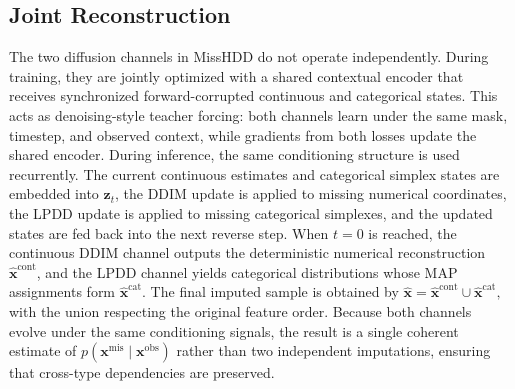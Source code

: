 \documentclass[times, review, 10pt]{elsarticle}
\begin{document}
\subsection{Joint Reconstruction}

The two diffusion channels in MissHDD do not operate independently. During
training, they are jointly optimized with a shared contextual encoder that
receives synchronized forward-corrupted continuous and categorical states. This
acts as denoising-style teacher forcing: both channels learn under the same
mask, timestep, and observed context, while gradients from both losses update
the shared encoder. During inference, the same conditioning structure is used
recurrently. The current continuous estimates and categorical simplex states
are embedded into $\mathbf{z}_t$, the DDIM update is applied to missing
numerical coordinates, the LPDD update is applied to missing categorical
simplexes, and the updated states are fed back into the next reverse step. When
$t=0$ is reached, the continuous DDIM channel outputs the deterministic
numerical reconstruction $\hat{\mathbf{x}}^{\mathrm{cont}}$, and the LPDD
channel yields categorical distributions whose MAP assignments form
$\hat{\mathbf{x}}^{\mathrm{cat}}$. The final imputed sample is obtained by $ \hat{\mathbf{x}} = \hat{\mathbf{x}}^{\mathrm{cont}}\cup \hat{\mathbf{x}}^{\mathrm{cat}},$ with the union respecting the original feature order. Because both channels evolve under the same conditioning signals, the result is a single coherent estimate of $p(\mathbf{x}^{\mathrm{mis}} \mid \mathbf{x}^{\mathrm{obs}})$ rather than two
independent imputations, ensuring that cross-type dependencies are preserved.
\end{document}
